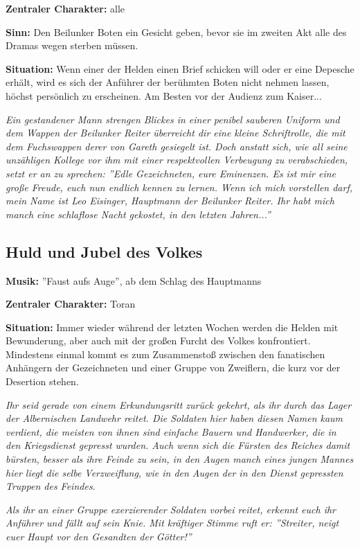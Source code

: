 \textbf{Zentraler Charakter:} alle 

\textbf{Sinn:} Den Beilunker Boten ein Gesicht geben, bevor sie im zweiten Akt alle des Dramas wegen sterben müssen.

\textbf{Situation:} Wenn einer der Helden einen Brief schicken will oder er eine Depesche erhält, wird es sich der Anführer der berühmten Boten nicht nehmen lassen, höchst persönlich zu erscheinen. Am Besten vor der Audienz zum Kaiser...
 

\emph{Ein gestandener Mann strengen Blickes in einer penibel sauberen Uniform und dem Wappen der Beilunker Reiter überreicht dir eine kleine Schriftrolle, die mit dem Fuchswappen derer von Gareth gesiegelt ist. Doch anstatt sich, wie all seine unzähligen Kollege vor ihm mit einer respektvollen Verbeugung zu verabschieden, setzt er an zu sprechen: ''Edle Gezeichneten, eure Eminenzen. Es ist mir eine große Freude, euch nun endlich kennen zu lernen. Wenn ich mich vorstellen darf, mein Name ist Leo Eisinger, Hauptmann der Beilunker Reiter. Ihr habt mich manch eine schlaflose Nacht gekostet, in den letzten Jahren...''}

\subsection{Huld und Jubel des Volkes}

\textbf{Musik:} ''Faust aufs Auge'', ab dem Schlag des Hauptmanns

\textbf{Zentraler Charakter:} Toran 

\textbf{Situation:} Immer wieder während der letzten Wochen werden die Helden mit Bewunderung, aber auch mit der großen Furcht des Volkes konfrontiert. Mindestens einmal kommt es zum Zusammenstoß zwischen den fanatischen Anhängern der Gezeichneten und einer Gruppe von Zweiflern, die kurz vor der Desertion stehen. 

\emph{Ihr seid gerade von einem Erkundungsritt zurück gekehrt, als ihr durch das Lager der Albernischen Landwehr reitet. Die Soldaten hier haben diesen Namen kaum verdient, die meisten von ihnen sind einfache Bauern und Handwerker, die in den Kriegsdienst gepresst wurden. Auch wenn sich die Fürsten des Reiches damit bürsten, besser als ihre Feinde zu sein, in den Augen manch eines jungen Mannes hier liegt die selbe Verzweiflung, wie in den Augen der in den Dienst gepressten Truppen des Feindes.} 

\emph{Als ihr an einer Gruppe exerzierender Soldaten vorbei reitet, erkennt euch ihr Anführer und fällt auf sein Knie. Mit kräftiger Stimme ruft er: ''Streiter, neigt euer Haupt vor den Gesandten der Götter!''} 

